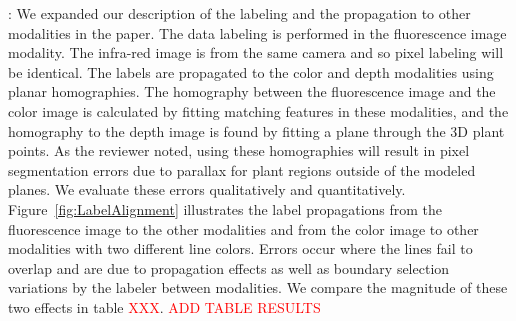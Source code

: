 \documentclass[11pt,letterpaper]{article}
\newcommand\todo[1]{\textcolor{red}{#1}}
\newenvironment{response}
{\noindent {\bf Response}: \color{black}}
{\color{black} \vspace{1.6em}}
\begin{document}
\begin{response}
We expanded our description of the labeling and the propagation to other modalities in the paper.  The data labeling is performed in the fluorescence image modality.  The infra-red image is from the same camera and so pixel labeling will be identical.  The labels are propagated to the color and depth modalities using planar homographies.  The homography between the fluorescence image and the color image is calculated by fitting matching features in these modalities, and the homography to the depth image is found by fitting a plane through the 3D plant points.  As the reviewer noted, using these homographies will result in pixel segmentation errors due to parallax for plant regions outside of the modeled planes.  We evaluate these errors qualitatively and quantitatively.  Figure~\ref{fig:LabelAlignment} illustrates the label propagations from the fluorescence image to the other modalities and from the color image to other modalities with two different line colors.  Errors occur where the lines fail to overlap and are due to propagation effects as well as boundary selection variations by the labeler between modalities.  We compare the magnitude of these two effects in table \todo{XXX}. \todo{ADD TABLE RESULTS}



\end{response}
\end{document}
